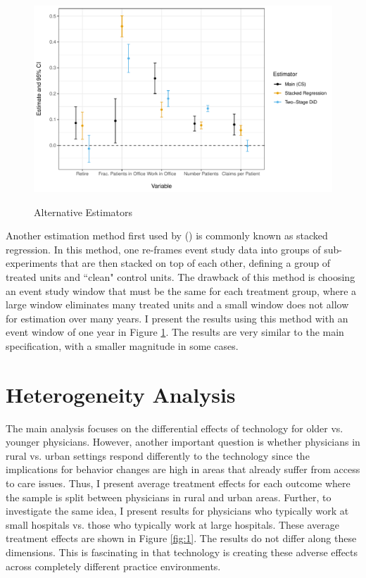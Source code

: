 \documentclass[12pt]{article}
\begin{document}
\begin{figure}
    \centering
    \caption{Alternative Estimators}
    \includegraphics[scale=.7]{Objects/estimators_plot.pdf}
    \label{fig:estimators}
\end{figure}

Another estimation method first used by \citeauthor{cengiz2019effect} (\citeyear{cengiz2019effect}) is commonly known as stacked regression. In this method, one re-frames event study data into groups of sub-experiments that are then stacked on top of each other, defining a group of treated units and ``clean" control units. The drawback of this method is choosing an event study window that must be the same for each treatment group, where a large window eliminates many treated units and a small window does not allow for estimation over many years. I present the results using this method with an event window of one year in Figure \ref{fig:estimators}. The results are very similar to the main specification, with a smaller magnitude in some cases. 





\section{Heterogeneity Analysis}

The main analysis focuses on the differential effects of technology for older vs. younger physicians. However, another important question is whether physicians in rural vs. urban settings respond differently to the technology since the implications for behavior changes are high in areas that already suffer from access to care issues. Thus, I present average treatment effects for each outcome where the sample is split between physicians in rural and urban areas. Further, to investigate the same idea, I present results for physicians who typically work at small hospitals vs. those who typically work at large hospitals. These average treatment effects are shown in Figure \ref{fig:1}. The results do not differ along these dimensions. This is fascinating in that technology is creating these adverse effects across completely different practice environments.
\end{document}
